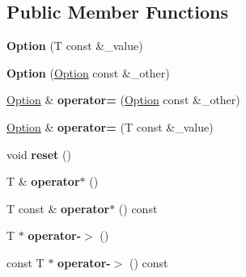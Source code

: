 \subsection*{Public Member Functions}
\begin{DoxyCompactItemize}
\item 
\hypertarget{class_catch_1_1_option_a5aeb9c22d48a6882bdf5fb4730b06c86}{{\bfseries Option} (T const \&\-\_\-value)}\label{class_catch_1_1_option_a5aeb9c22d48a6882bdf5fb4730b06c86}

\item 
\hypertarget{class_catch_1_1_option_af02f2e4559f06384baec0def8c68c5fd}{{\bfseries Option} (\hyperlink{class_catch_1_1_option}{Option} const \&\-\_\-other)}\label{class_catch_1_1_option_af02f2e4559f06384baec0def8c68c5fd}

\item 
\hypertarget{class_catch_1_1_option_a78c65b15dd6b2fbd04c5012c43017c8f}{\hyperlink{class_catch_1_1_option}{Option} \& {\bfseries operator=} (\hyperlink{class_catch_1_1_option}{Option} const \&\-\_\-other)}\label{class_catch_1_1_option_a78c65b15dd6b2fbd04c5012c43017c8f}

\item 
\hypertarget{class_catch_1_1_option_a2be7e343ab22d6061726d32ab4622653}{\hyperlink{class_catch_1_1_option}{Option} \& {\bfseries operator=} (T const \&\-\_\-value)}\label{class_catch_1_1_option_a2be7e343ab22d6061726d32ab4622653}

\item 
\hypertarget{class_catch_1_1_option_a37b4e0e5d4d56296adacd267a616f4e0}{void {\bfseries reset} ()}\label{class_catch_1_1_option_a37b4e0e5d4d56296adacd267a616f4e0}

\item 
\hypertarget{class_catch_1_1_option_afd989852fa453731c3190dac63caccb0}{T \& {\bfseries operator$\ast$} ()}\label{class_catch_1_1_option_afd989852fa453731c3190dac63caccb0}

\item 
\hypertarget{class_catch_1_1_option_a0f05708905dc6b0b470fb24f5d265631}{T const \& {\bfseries operator$\ast$} () const }\label{class_catch_1_1_option_a0f05708905dc6b0b470fb24f5d265631}

\item 
\hypertarget{class_catch_1_1_option_acad340798a16c8f700f8763119e90f31}{T $\ast$ {\bfseries operator-\/$>$} ()}\label{class_catch_1_1_option_acad340798a16c8f700f8763119e90f31}

\item 
\hypertarget{class_catch_1_1_option_a0800340b2971748671b88acfb14bb928}{const T $\ast$ {\bfseries operator-\/$>$} () const }\label{class_catch_1_1_option_a0800340b2971748671b88acfb14bb928}


\end{DoxyCompactItemize}
